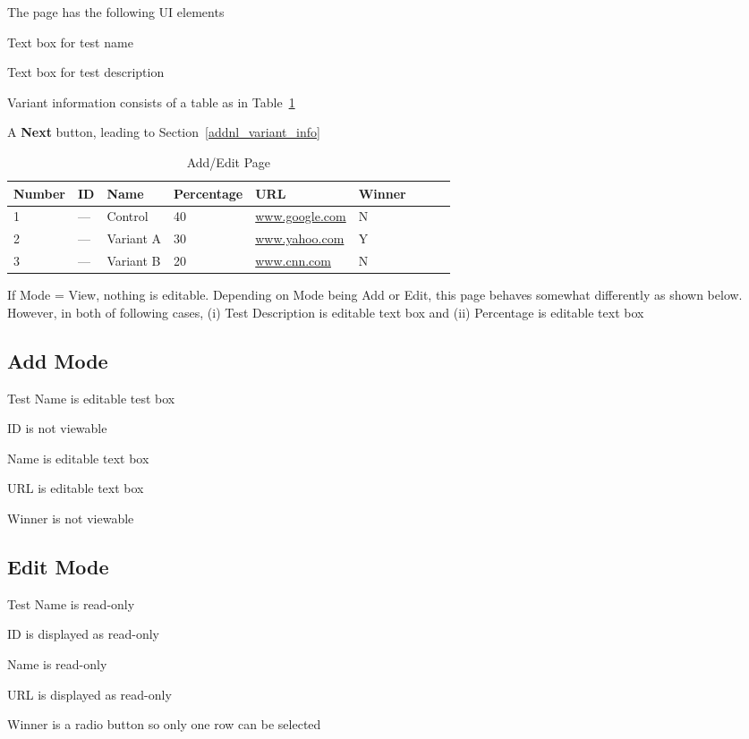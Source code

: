 \documentclass[letterpaper]{article}
\begin{document}
The page has the following UI elements
\be
\item Text box for test name 
\item Text box for test description
\item Variant information consists of a table as in Table~\ref{tbl_page_1}
\item A {\bf Next} button, leading to Section~\ref{addnl_variant_info}
  \ee
\begin{table}[hb]
\centering
\begin{tabular}{|l||l|l|l|l|l|l|l|l|}  \hline \hline
  {\bf Number} &   {\bf ID} & {\bf Name} & {\bf Percentage} 
  & {\bf URL} & {\bf Winner} \\ \hline \hline
  1 & --- & Control & 40   & \url{www.google.com} & N \\ \hline
  2 & --- & Variant A & 30  & \url{www.yahoo.com} & Y \\ \hline
  3 & --- & Variant B & 20  & \url{www.cnn.com} & N \\ \hline
\hline
\end{tabular}
\caption{Add/Edit Page}
\label{tbl_page_1}
\end{table}
If Mode = View, nothing is editable. 
Depending on Mode being Add or Edit, this page behaves somewhat differently as shown below.
 However, in both of following cases, 
 (i)  Test Description is editable text box
 and (ii) Percentage is editable text box
 \subsection{Add Mode}
 \label{add_edit_basic_page_add_mode}
 \bi
 \item Test Name is editable test box 
 \item ID is not viewable
 \item Name is editable text box
 \item URL is editable text box
 \item Winner is not viewable
\ei
 \subsection{Edit Mode}
 \label{add_edit_basic_page_edit_mode}
 \bi
 \item Test Name is read-only
 \item ID is displayed as read-only
 \item Name is read-only
 \item URL is displayed as read-only 
 \item Winner is a radio button so only one row can be selected
   \ei
\end{document}
